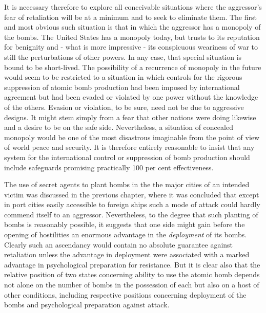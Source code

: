 It is necessary therefore to explore all conceivable situations where the aggressor's fear of retaliation will be at a minimum and to seek to eliminate them. The first and most obvious such situation is that in which the aggressor has a monopoly of the bombs. The United States has a monopoly today, but trusts to its reputation for benignity and - what is more impressive - its conspicuous weariness of war to still the perturbations of other powers. In any case, that special situation is bound to be short-lived. The possibility of a recurrence of monopoly in the future would seem to be restricted to a situation in which controls for the rigorous suppression of atomic bomb production had been imposed by international agreement but had been evaded or violated by one power without the knowledge of the others. Evasion or violation, to be sure, need not be due to aggressive designs. It might stem simply from a fear that other nations were doing likewise and a desire to be on the safe side. Nevertheless, a situation of concealed monopoly would be one of the most disastrous imaginable from the point of view of world peace and security. It is therefore entirely reasonable to insist that any system for the international control or suppression of bomb production should include safeguards promising practically 100 per cent effectiveness.

The use of secret agents to plant bombs in the the major cities of an intended victim was discussed in the previous chapter, where it was concluded that except in port cities easily accessible to foreign ships such a mode of attack could hardly commend itself to an aggressor. Nevertheless, to the degree that such planting of bombs is reasonably possible, it suggests that one side might gain before the opening of hostilities an enormous advantage in the \emph{deployment} of its bombs. Clearly such an ascendancy would contain no absolute guarantee against retaliation unless the advantage in deployment were associated with a marked advantage in psychological preparation for resistance. But it is clear also that the relative position of two states concerning ability to use the atomic bomb depends not alone on the number of bombs in the possession of each but also on a host of other conditions, including respective positions concerning deployment of the bombs and psychological preparation against attack.

